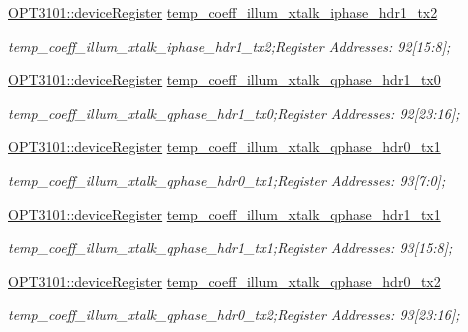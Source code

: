 \begin{DoxyCompactItemize}
\mbox{\hyperlink{class_o_p_t3101_1_1device_register}{O\+P\+T3101\+::device\+Register}} \mbox{\hyperlink{class_o_p_t3101_1_1registers_a4a58b09e744e6b03b116457d005ae826}{temp\+\_\+coeff\+\_\+illum\+\_\+xtalk\+\_\+iphase\+\_\+hdr1\+\_\+tx2}}
\begin{DoxyCompactList}\small\item\em temp\+\_\+coeff\+\_\+illum\+\_\+xtalk\+\_\+iphase\+\_\+hdr1\+\_\+tx2;Register Addresses\+: 92\mbox{[}15\+:8\mbox{]}; \end{DoxyCompactList}\item 
\mbox{\hyperlink{class_o_p_t3101_1_1device_register}{O\+P\+T3101\+::device\+Register}} \mbox{\hyperlink{class_o_p_t3101_1_1registers_ac5de758e638084d01705bd583054e534}{temp\+\_\+coeff\+\_\+illum\+\_\+xtalk\+\_\+qphase\+\_\+hdr1\+\_\+tx0}}
\begin{DoxyCompactList}\small\item\em temp\+\_\+coeff\+\_\+illum\+\_\+xtalk\+\_\+qphase\+\_\+hdr1\+\_\+tx0;Register Addresses\+: 92\mbox{[}23\+:16\mbox{]}; \end{DoxyCompactList}\item 
\mbox{\hyperlink{class_o_p_t3101_1_1device_register}{O\+P\+T3101\+::device\+Register}} \mbox{\hyperlink{class_o_p_t3101_1_1registers_a20f6c572d3a82036d95d59755de1b38e}{temp\+\_\+coeff\+\_\+illum\+\_\+xtalk\+\_\+qphase\+\_\+hdr0\+\_\+tx1}}
\begin{DoxyCompactList}\small\item\em temp\+\_\+coeff\+\_\+illum\+\_\+xtalk\+\_\+qphase\+\_\+hdr0\+\_\+tx1;Register Addresses\+: 93\mbox{[}7\+:0\mbox{]}; \end{DoxyCompactList}\item 
\mbox{\hyperlink{class_o_p_t3101_1_1device_register}{O\+P\+T3101\+::device\+Register}} \mbox{\hyperlink{class_o_p_t3101_1_1registers_ab5488b3b70c9ab0de936c2c3db408c25}{temp\+\_\+coeff\+\_\+illum\+\_\+xtalk\+\_\+qphase\+\_\+hdr1\+\_\+tx1}}
\begin{DoxyCompactList}\small\item\em temp\+\_\+coeff\+\_\+illum\+\_\+xtalk\+\_\+qphase\+\_\+hdr1\+\_\+tx1;Register Addresses\+: 93\mbox{[}15\+:8\mbox{]}; \end{DoxyCompactList}\item 
\mbox{\hyperlink{class_o_p_t3101_1_1device_register}{O\+P\+T3101\+::device\+Register}} \mbox{\hyperlink{class_o_p_t3101_1_1registers_a7f84efb8fc4a32aa3b42881c0467b2db}{temp\+\_\+coeff\+\_\+illum\+\_\+xtalk\+\_\+qphase\+\_\+hdr0\+\_\+tx2}}
\begin{DoxyCompactList}\small\item\em temp\+\_\+coeff\+\_\+illum\+\_\+xtalk\+\_\+qphase\+\_\+hdr0\+\_\+tx2;Register Addresses\+: 93\mbox{[}23\+:16\mbox{]}; \end{DoxyCompactList}\item 

\end{DoxyCompactItemize}
